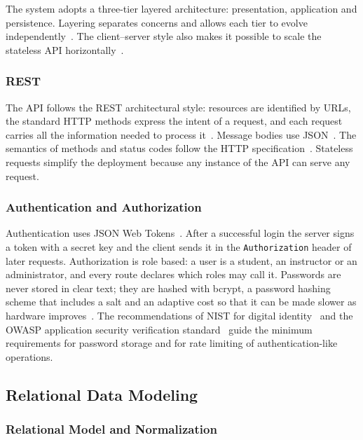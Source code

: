 The system adopts a three-tier layered architecture: presentation, application and persistence. Layering separates concerns and allows each tier to evolve independently~\cite{bass2021software, fowler2002patterns}. The client--server style also makes it possible to scale the stateless API horizontally~\cite{fielding2000architectural}.

\subsubsection{REST}

The API follows the REST architectural style: resources are identified by URLs, the standard HTTP methods express the intent of a request, and each request carries all the information needed to process it~\cite{fielding2000architectural}. Message bodies use JSON~\cite{rfc8259}. The semantics of methods and status codes follow the HTTP specification~\cite{rfc9110}. Stateless requests simplify the deployment because any instance of the API can serve any request.

\subsubsection{Authentication and Authorization}

Authentication uses JSON Web Tokens~\cite{rfc7519}. After a successful login the server signs a token with a secret key and the client sends it in the \texttt{Authorization} header of later requests. Authorization is role based: a user is a student, an instructor or an administrator, and every route declares which roles may call it. Passwords are never stored in clear text; they are hashed with bcrypt, a password hashing scheme that includes a salt and an adaptive cost so that it can be made slower as hardware improves~\cite{provos1999bcrypt}. The recommendations of NIST for digital identity~\cite{nist80063b} and the OWASP application security verification standard~\cite{owaspasvs} guide the minimum requirements for password storage and for rate limiting of authentication-like operations.

\subsection{Relational Data Modeling}

\subsubsection{Relational Model and Normalization}

